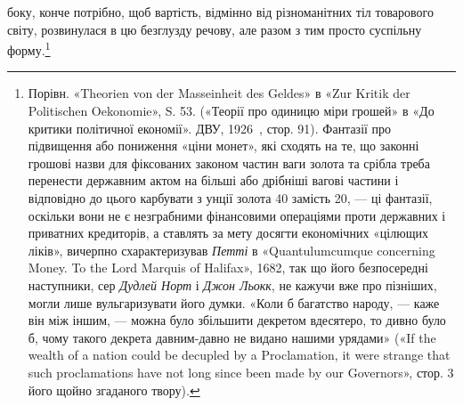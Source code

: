 \parcont{}  %
боку, конче потрібно, щоб вартість, відмінно від різноманітних
тіл товарового світу, розвинулася в цю безглузду речову, але
разом з тим просто суспільну форму.\footnote{
Порівн. «Theorien von der Masseinheit des Geldes» в «Zur Kritik
der Politischen Oekonomie», S. 53. («Теорії про одиницю міри грошей»
в «До критики політичної економії». ДВУ, 1926~, стор. 91). Фантазії
про підвищення або пониження «ціни монет», які сходять на те, що законні
грошові назви для фіксованих законом частин ваги золота та срібла
треба перенести державним актом на більші або дрібніші вагові частини
і відповідно до цього карбувати з  унції золота 40 замість 20, —
ці фантазії, оскільки вони не є незграбними фінансовими операціями проти
державних і приватних кредиторів, а ставлять за мету досягти економічних
«цілющих ліків», вичерпно схарактеризував \emph{Петті} в «Quantulumcumque
concerning Money. To the Lord Marquis of Halifax», 1682, так
що його безпосередні наступники, сер \emph{Дудлей Норт} і \emph{Джон Льокк},
не кажучи вже про пізніших, могли лише вульгаризувати його
думки. «Коли б багатство народу, — каже він між іншим, — можна
було збільшити декретом вдесятеро, то дивно було б, чому такого декрета
давним-давно не видано нашими урядами» («If the wealth of a nation
could be decupled by a Proclamation, it were strange that such proclamations
have not long since been made by our Governors», стор. 3 його щойно згаданого
твору).
}

